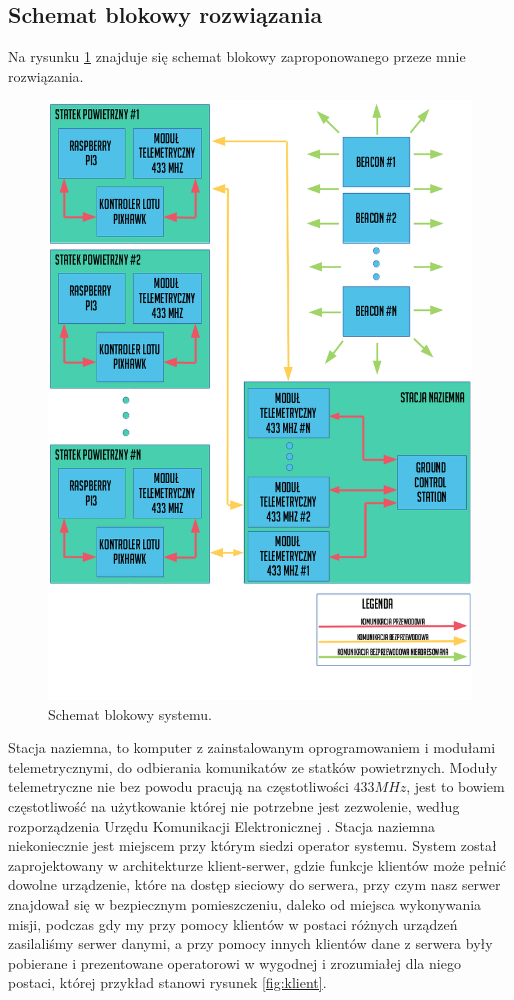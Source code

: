 \subsection{Schemat blokowy rozwiązania}
Na rysunku \ref{fig:schematblokowy} znajduje się schemat blokowy zaproponowanego przeze mnie rozwiązania.
\begin{figure}[!th]
    \centering
    \includegraphics[width=14cm]{zalaczniki/obrazy/schemat_ogolny.png}
    \caption{Schemat blokowy systemu.}
    \label{fig:schematblokowy}
\end{figure}

Stacja naziemna, to komputer z zainstalowanym oprogramowaniem i modułami telemetrycznymi, do odbierania komunikatów ze statków powietrznych. Moduły telemetryczne nie bez powodu pracują na częstotliwości $433 MHz$, jest to bowiem częstotliwość na użytkowanie której nie potrzebne jest zezwolenie, według rozporządzenia Urzędu Komunikacji Elektronicznej \cite{rozporzadzenieuke}. Stacja naziemna niekoniecznie jest miejscem przy którym siedzi operator systemu. System został zaprojektowany w architekturze klient-serwer, gdzie funkcje klientów może pełnić dowolne urządzenie, które na dostęp sieciowy do serwera, przy czym nasz serwer znajdował się w bezpiecznym pomieszczeniu, daleko od miejsca wykonywania misji, podczas gdy my przy pomocy klientów w postaci różnych urządzeń zasilaliśmy serwer danymi, a przy pomocy innych klientów dane z serwera były pobierane i prezentowane operatorowi w wygodnej i zrozumiałej dla niego postaci, której przykład stanowi rysunek \ref{fig:klient}.

